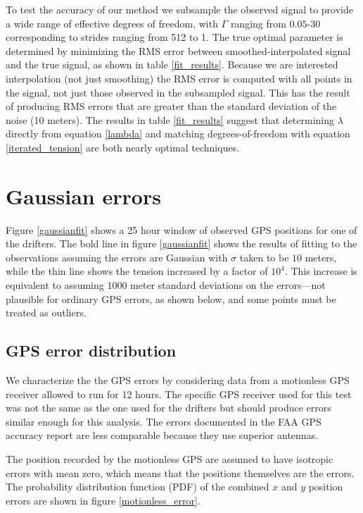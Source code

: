 \documentclass[twocol]{ametsoc}
\begin{document}
To test the accuracy of our method we subsample the observed signal to provide a wide range of effective degrees of freedom, with $\Gamma$ ranging from $0.05$-$30$ corresponding to strides ranging from 512 to 1. The true optimal parameter is determined by minimizing the RMS error between smoothed-interpolated signal and the true signal, as shown in table \ref{fit_results}. Because we are interested interpolation (not just smoothing) the RMS error is computed with all points in the signal, not just those observed in the subsampled signal. This has the result of producing RMS errors that are greater than the standard deviation of the noise (10 meters). The results in table \ref{fit_results} suggest that determining $\lambda$ directly from equation \ref{lambda} and matching degrees-of-freedom with equation \ref{iterated_tension} are both nearly optimal techniques.

\section{Gaussian errors}


Figure \ref{gaussianfit} shows a 25 hour window of observed GPS positions for one of the drifters. The bold line in figure \ref{gaussianfit} shows the results of fitting to the observations assuming the errors are Gaussian with $\sigma$ taken to be $10$ meters, while the thin line shows the tension increased by a factor of $10^4$. This increase is equivalent to assuming $1000$ meter standard deviations on the errors---not plausible for ordinary GPS errors, as shown below, and some points must be treated as outliers. 

%
\subsection{GPS error distribution}
%

We characterize the the GPS errors by considering data from a motionless GPS receiver allowed to run for 12 hours. The specific GPS receiver used for this test was not the same as the one used for the drifters but should produce errors similar enough for this analysis. The errors documented in the FAA GPS accuracy report \citep{faa2016-report} are less comparable because they use superior antennas.

The position recorded by the motionless GPS are assumed to have isotropic errors with mean zero, which means that the positions themselves are the errors. The probability distribution function (PDF) of the combined $x$ and $y$ position errors are shown in figure \ref{motionless_error}.
\end{document}
